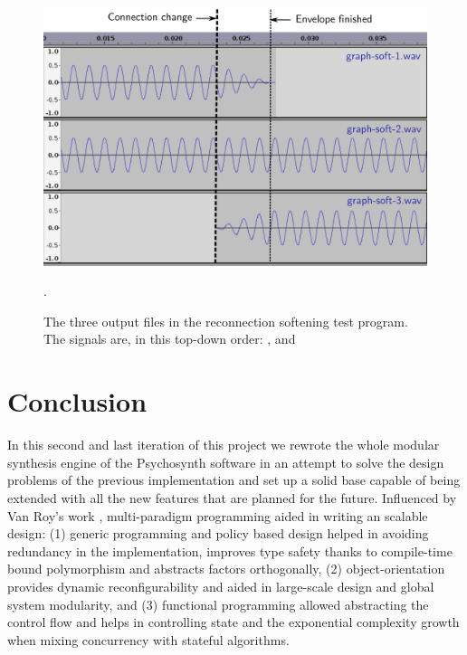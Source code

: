 \begin{figure}[h!]
  \centering
  \includegraphics[width=\textwidth]{pic/sound-vis.pdf}
  \caption[The three output files in the reconnection softening test
  program.]{The three output files in the reconnection softening test
    program. The signals are, in this top-down order:
    ,  and
    }.
  \label{fig:soft-audacity}
\end{figure}


\section{Conclusion}

In this second and last iteration of
this project we rewrote the whole modular synthesis engine of the
Psychosynth software in an attempt to solve the design problems of the
previous implementation and set up a solid base capable of being
extended with all the new features that are planned for the
future. Influenced by Van Roy's work \cite{roy04concepts},
multi-paradigm programming aided in writing an scalable design: (1)
generic programming and policy based design helped in avoiding
redundancy in the implementation, improves type safety thanks to
compile-time bound polymorphism and abstracts factors orthogonally,
(2) object-orientation provides dynamic reconfigurability and aided in
large-scale design and global system modularity, and (3) functional
programming allowed abstracting the control flow and helps in
controlling state and the exponential complexity growth when mixing
concurrency with stateful algorithms.

